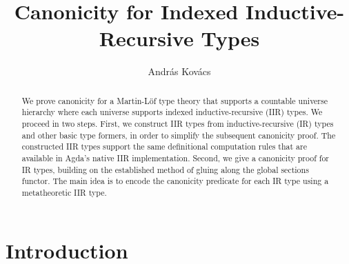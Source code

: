 \documentclass[acmsmall,screen,review,anonymous]{acmart}
\begin{document}
\title{Canonicity for Indexed Inductive-Recursive Types}

\author{András Kovács}


\begin{abstract}
We prove canonicity for a Martin-Löf type theory that supports a countable universe hierarchy where
each universe supports indexed inductive-recursive (IIR) types. We proceed in two steps. First, we
construct IIR types from inductive-recursive (IR) types and other basic type formers, in order to
simplify the subsequent canonicity proof. The constructed IIR types support the same definitional
computation rules that are available in Agda's native IIR implementation. Second, we give a
canonicity proof for IR types, building on the established method of gluing along the global
sections functor. The main idea is to encode the canonicity predicate for each IR type using a
metatheoretic IIR type.
\end{abstract}


\maketitle

\section{Introduction}\label{sec:introduction}
\end{document}
